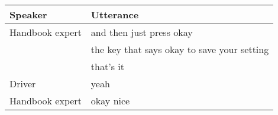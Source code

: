 \begin{table}[H]
\begin{tabular}{p{3cm}p{8cm}}
Speaker & Utterance \\
\hline
Handbook expert & and then just press okay                                                                                              \\
                  & the key that says okay to save your setting                                                                           \\
 & that's it                                                                                                             \\
Driver          & yeah                                                                                                                  \\
Handbook expert & okay nice                                                                                                             \\


\end{tabular}
\end{table}
